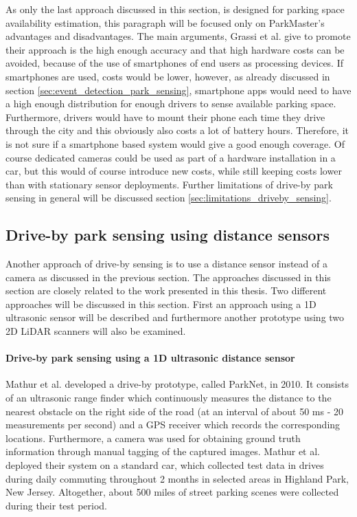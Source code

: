 As only the last approach discussed in this section, is designed for parking space availability estimation, this paragraph will be focused only on ParkMaster's advantages and disadvantages. The main arguments, Grassi et al. give to promote their approach is the high enough accuracy and that high hardware costs can be avoided, because of the use of smartphones of end users as processing devices. If smartphones are used, costs would be lower, however, as already discussed in section \ref{sec:event_detection_park_sensing}, smartphone apps would need to have a high enough distribution for enough drivers to sense available parking space. Furthermore, drivers would have to mount their phone each time they drive through the city and this obviously also costs a lot of battery hours. Therefore, it is not sure if a smartphone based system would give a good enough coverage. Of course dedicated cameras could be used as part of a hardware installation in a car, but this would of course introduce new costs, while still keeping costs lower than with stationary sensor deployments. Further limitations of drive-by park sensing in general will be discussed section \ref{sec:limitations_driveby_sensing}.





\subsection{Drive-by park sensing using distance sensors}
\label{sec:related_driveby_park_sensing_distance}

Another approach of drive-by sensing is to use a distance sensor instead of a camera as discussed in the previous section. The approaches discussed in this section are closely related to the work presented in this thesis. Two different approaches will be discussed in this section. First an approach using a 1D ultrasonic sensor will be described and furthermore another prototype using two 2D LiDAR scanners will also be examined.

\paragraph{Drive-by park sensing using a 1D ultrasonic distance sensor}

Mathur et al. \cite{Mathur:2010:PDS:1814433.1814448} developed a drive-by prototype, called ParkNet, in 2010. It consists of an ultrasonic range finder which continuously measures the distance to the nearest obstacle on the right side of the road (at an interval of about 50 ms - 20 measurements per second) and a GPS receiver which records the corresponding locations. Furthermore, a camera was used for obtaining ground truth information through manual tagging of the captured images. Mathur et al. deployed their system on a standard car, which collected test data in drives during daily commuting throughout 2 months in selected areas in Highland Park, New Jersey. Altogether, about 500 miles of street parking scenes were collected during their test period.

